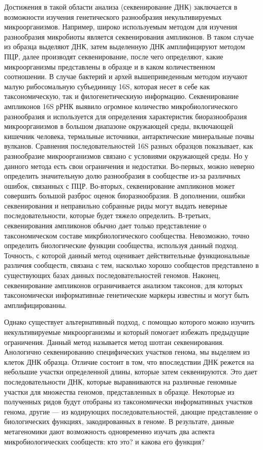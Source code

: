 Достижения в такой области анализа (секвенирование ДНК) заключается в возможности изучения генетического разнообразия некультивируемых микроорганизмов. Например,
широко используемым методом для изучения разнообразия микробиоты является секвенирования ампликонов. В таком случае из образца выделяют ДНК, затем выделенную ДНК
амплифицируют методом ПЦР, далее производят секвенирование, после чего определяют,
какие микроорганизмы представлены в образце и в каком количественном соотношении. В
случае бактерий и архей вышеприведенным методом изучают малую рибосомальную субъединицу 16S, которая несет в себе как таксономическую, так и филогенетическиую информацию. Секвенирование ампликонов 16S рРНК выявило огромное количество микробиологического разнообразия и используется для определения характеристик биоразнообразия микроорганизмов в большом диапазоне окружающей среды, включающей кишечник человека,
термальные источники, антарктические минеральные почвы вулканов. Сравнения последовательностей 16S разных образцов показывает, как разнообразие микроорганизмов связано
с условиями окружающей среды. Но у данного метода есть свои ограничения и недостатки. Во-первых, можно неверно определить значительную долю разнообразия в сообществе
из-за различных ошибок, связанных с ПЦР. Во-вторых, секвенирование ампликонов может
совершить большой разброс оценок биоразнообразия. В дополнении, ошибки секвенирования и неправильно собранные риды могут выдать неверные последовательности, которые
будет тяжело определить. В-третьих, секвенирования ампликонов обычно дает только представление о таксономическом составе микрбиологического сообщества. Невозможно, точно
определить биологические функции сообщества, используя данный подход. Точность, с которой данный метод оценивает действительные функциональные различия сообществ, связана
с тем, насколько хорошо сообщестов представлено в существующих базах данных последовательностей геномов. Наконец, секвенирование ампликонов ограничивается анализом таксонов, для которых таксономически информативные генетические маркеры известны и могут
быть амплифицированны.

Однако существует альтернативный подход, с помощью которого можно изучить некультивируемые микроорганизмы и который помогает избежать предыдущие ограничения. Данный метод называется метод шотган секвенирования. Анологично секвенированию специфических участков генома, мы выделяем из клеток ДНК образца. Отличие состоит в том,
что впоследствии ДНК режется на небольшие участки определенной длины, которые затем
секвенируются. Это дает последовательности ДНК, которые выравниваются на различные
геномные участки для множества геномов, представленных в образце. Некоторые из полученных ридов будут отобраны из таксономически информативных участков генома, другие
— из кодирующих последовательностей, дающие представление о биологических функциях,
закодированных в геноме. В результате, данные метагеномики дают возможность одновременно изучать два аспекта микробиологических сообществ: кто это? и какова его функция?


